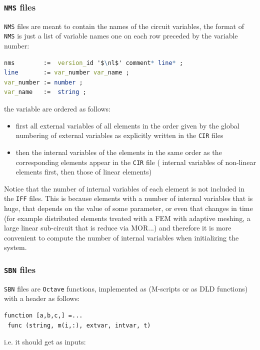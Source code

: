 \documentclass{scrartcl}
\newcommand{\Iff}{{\tt IFF}}
\newcommand{\cir}{{\tt CIR}}
\newcommand{\nms}{{\tt NMS}}
\newcommand{\sbn}{{\tt SBN}}
\newcommand{\nl}{{\tt \backslash n}}
\newcommand{\oct}{{\tt Octave}}
\begin{document}
\subsubsection{{\nms} files}

{\nms} files are meant to contain the names of the circuit variables, 
the format of {\nms} is just a list
of variable names one on each row preceded by the variable number:

\begin{lstlisting}[language=Mathematica,mathescape=true,backgroundcolor={}]
nms        :=  version_id '$\nl$' comment* line* ;
line       := var_number var_name ;
var_number := number ;
var_name   :=  string ;
\end{lstlisting}

the variable are ordered as follows:
\begin{itemize}
\item first all external variables of all elements 
in the order given by the global numbering of external variables as 
explicitly written in the {\cir} 
files
\item then the internal variables of the elements in the same order as the
corresponding elements appear in the {\cir} file 
( internal variables of non-linear elements first, then those of linear elements)
\end{itemize}

Notice that the number of internal variables of each element is not included 
in the {\Iff} files. 
This is because elements with a number of internal variables that is huge, that depends on the value of some parameter, or even that changes in time (for example distributed elements treated with a FEM with adaptive meshing, a large linear sub-circuit that is reduce via MOR...) and therefore it is more convenient to compute the number of internal variables when initializing the system.

\subsubsection{{\sbn} files} \label{ssecsbn}

{\sbn} files are {\oct} functions, implemented as (M-scripts or as 
DLD functions) with a header as follows:

\begin{lstlisting}
function [a,b,c,] =...
 func (string, m(i,:), extvar, intvar, t)
\end{lstlisting}

i.e. it should get as inputs:
\end{document}
